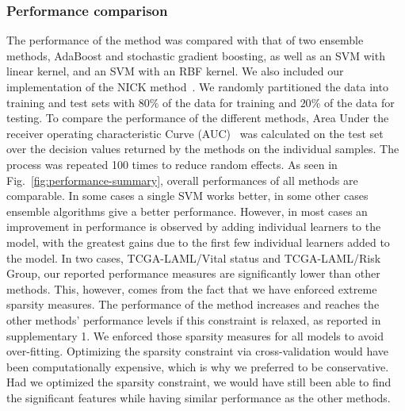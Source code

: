 \subsubsection{Performance comparison}
The performance of the method was compared with that of two ensemble methods, AdaBoost and stochastic gradient boosting, as well as an SVM with linear kernel, and an SVM with an RBF kernel. We also included our implementation of the NICK method~\cite{Lavi2012}.
We randomly partitioned the data into training and test sets with $80\%$ of the data for training and $20\%$ of the data for testing. To compare the performance of the different methods, Area Under the receiver operating characteristic Curve (AUC)~\cite{egan1975signal} was calculated on the test set over the decision values returned by the methods on the individual samples. The process was repeated 100 times to reduce random effects.
As seen in Fig.~\ref{fig:performance-summary}, overall performances of all methods are comparable. In some cases a single SVM works better, in some other cases ensemble algorithms give a better performance. However, in most cases an improvement in performance is observed by adding individual learners to the model, with the greatest gains due to the first few individual learners added to the model. 
In two cases, TCGA-LAML/Vital status and TCGA-LAML/Risk Group, our
reported performance measures are significantly lower than other
methods. This, however, comes from the fact that we have enforced
extreme sparsity measures. The performance of the method increases and
reaches the other methods' performance levels if this constraint is
relaxed, as reported in supplementary 1. 
We enforced those sparsity measures for all models to avoid over-fitting. Optimizing the sparsity constraint via cross-validation would have been computationally expensive, which is why we preferred to be conservative. Had we optimized the sparsity constraint, we would have still been able to find the significant features while having similar performance as the other methods.


